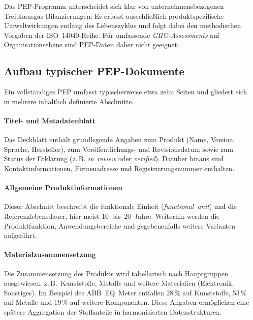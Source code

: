 Das PEP-Programm unterscheidet sich klar von unternehmensbezogenen Treibhausgas-Bilanzierungen: 
Es erfasst ausschließlich produktspezifische Umweltwirkungen entlang des Lebenszyklus und folgt dabei den methodischen Vorgaben der ISO~14040-Reihe. 
Für umfassende \emph{GHG-Assessments} auf Organisationsebene sind PEP-Daten daher nicht geeignet.


\subsection{Aufbau typischer PEP-Dokumente}

Ein vollständiges PEP umfasst typischerweise etwa zehn Seiten und gliedert sich in mehrere inhaltlich definierte Abschnitte.

\paragraph{Titel- und Metadatenblatt}
Das Deckblatt enthält grundlegende Angaben zum Produkt (Name, Version, Sprache, Hersteller), zum Veröffentlichungs- und Revisionsdatum
sowie zum Status der Erklärung (z.\,B. \emph{in~review} oder \emph{verified}). Darüber hinaus sind Kontaktinformationen, Firmenadresse und 
Registrierungsnummer enthalten. 

\paragraph{Allgemeine Produktinformationen}
Dieser Abschnitt beschreibt die funktionale Einheit (\emph{functional~unit}) und die Referenzlebensdauer, hier meist 10~bis~20~Jahre. 
Weiterhin werden die Produktfunktion, Anwendungsbereiche und gegebenenfalls weitere Varianten aufgeführt. 

\paragraph{Materialzusammensetzung}
Die Zusammensetzung des Produkts wird tabellarisch nach Hauptgruppen ausgewiesen, z.\,B.\ Kunststoffe, Metalle und weitere Materialien 
(Elektronik, Sonstiges). Im Beispiel des ABB~EQ~Meter entfallen 28\,\% auf Kunststoffe, 53\,\% auf Metalle und 19\,\% auf weitere Komponenten. 
Diese Angaben ermöglichen eine spätere Aggregation der Stoffanteile in harmonisierten Datenstrukturen.

